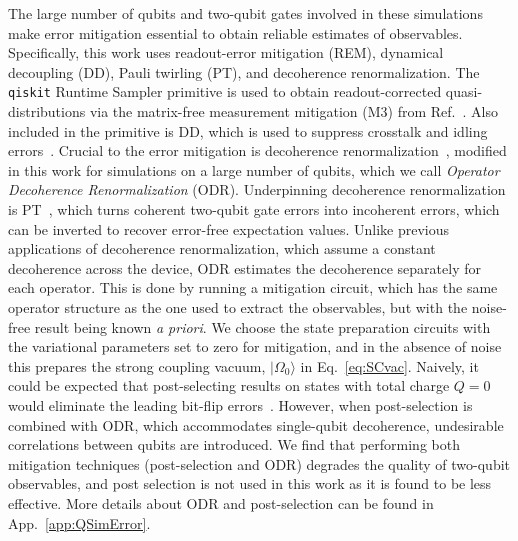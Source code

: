 \documentclass[aps, pra, onecolumn, tightenlines, letterpaper, amsmath, amssymb, preprintnumbers, floatfix, longbibliography, nofootinbib]{revtex4-2}
\begin{document}
The large number of qubits and two-qubit gates involved in these 
simulations make error mitigation essential to obtain reliable estimates of observables.
Specifically, this work uses readout-error mitigation (REM), dynamical decoupling (DD), Pauli twirling (PT), and decoherence renormalization. 
The {\tt qiskit} Runtime Sampler primitive is used to obtain readout-corrected quasi-distributions via the matrix-free measurement mitigation (M3) from Ref.~\cite{Nation:2021kye}. 
Also included in the primitive is DD, which is used to suppress crosstalk and idling errors~\cite{Viola:1998dsd,2012RSPTA.370.4748S,Ezzell:2022uat}.
Crucial to the error mitigation is decoherence renormalization~\cite{Urbanek_2021,ARahman:2022tkr,Farrell:2022wyt,Ciavarella:2023mfc}, 
modified in this work for simulations on a large number of qubits, which we call {\it Operator Decoherence Renormalization} (ODR).
Underpinning decoherence renormalization is PT~\cite{Wallman:2016nts}, which turns coherent two-qubit gate errors into incoherent errors, which can be inverted to recover error-free expectation values.
Unlike previous applications of decoherence renormalization, 
which assume a constant decoherence across the device, 
ODR estimates the decoherence separately for each operator.
This is done by running a mitigation circuit, which has the same 
operator structure as the one used to extract the observables, but with the noise-free result being known {\it a priori}. 
We choose the state preparation circuits with the variational parameters 
set to zero for mitigation,
and 
in the absence of noise this prepares the strong coupling vacuum, $\lvert \Omega_0 \rangle$ in Eq.~\eqref{eq:SCvac}.
Naively, it could be expected that post-selecting results on states with 
total charge $Q = 0$ would eliminate the leading bit-flip errors~\cite{Klco:2019evd}.
However, when post-selection is combined with ODR, which accommodates single-qubit decoherence, undesirable correlations between qubits are introduced.
We find that performing both mitigation techniques 
(post-selection and ODR)
degrades the quality of two-qubit observables, 
and post selection is not used in this work as it is found to be less effective.
More details about ODR and post-selection can be found in App.~\ref{app:QSimError}.
\end{document}
